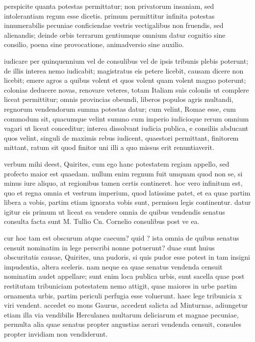  perspicite quanta potestas permittatur; non privatorum insaniam, sed intolerantiam regum esse dicetis. primum permittitur infinita potestas innumerabilis pecuniae conficiendae vestris vectigalibus non fruendis, sed alienandis; deinde orbis terrarum gentiumque omnium datur cognitio sine consilio, poena sine provocatione, animadversio sine auxilio.

 iudicare per quinquennium vel de consulibus vel de ipsis tribunis plebis poterunt; de illis interea nemo iudicabit; magistratus eis petere licebit, causam dicere non licebit; emere agros a quibus volent et quos volent quam volent magno poterunt; colonias deducere novas, renovare veteres, totam Italiam suis coloniis ut complere liceat permittitur; omnis provincias obeundi, liberos populos agris multandi, regnorum vendendorum summa potestas datur; cum velint, Romae esse, cum commodum sit, quacumque velint summo cum imperio iudicioque rerum omnium vagari ut liceat conceditur; interea dissolvant iudicia publica, e consiliis abducant quos velint, singuli de maximis rebus iudicent, quaestori permittant, finitorem mittant, ratum sit quod finitor uni illi a quo missus erit renuntiaverit.

 verbum mihi deest, Quirites, cum ego hanc potestatem regiam appello, sed profecto maior est quaedam. nullum enim regnum fuit umquam quod non se, si minus iure aliquo, at regionibus tamen certis contineret. hoc vero infinitum est, quo et regna omnia et vestrum imperium, quod latissime patet, et ea quae partim libera a vobis, partim etiam ignorata vobis sunt, permissu legis continentur. datur igitur eis primum ut liceat ea vendere omnia de quibus vendendis senatus consulta facta sunt M. Tullio Cn. Cornelio consulibus post ve ea.

 cur hoc tam est obscurum atque caecum? quid ? ista omnia de quibus senatus censuit nominatim in lege perscribi nonne potuerunt? duae sunt huius obscuritatis causae, Quirites, una pudoris, si quis pudor esse potest in tam insigni impudentia, altera sceleris. nam neque ea quae senatus vendenda censuit nominatim audet appellare; sunt enim loca publica urbis, sunt sacella quae post restitutam tribuniciam potestatem nemo attigit, quae maiores in urbe partim ornamenta urbis, partim periculi perfugia esse voluerunt. haec lege tribunicia x viri vendent. accedet eo mons Gaurus, accedent salicta ad Minturnas, adiungetur etiam illa via vendibilis Herculanea multarum deliciarum et magnae pecuniae, permulta alia quae senatus propter angustias aerari vendenda censuit, consules propter invidiam non vendiderunt.

